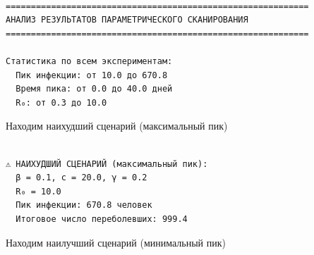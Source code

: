 \documentclass[
  12pt,
  a4paper,
  DIV=11,
  numbers=noendperiod]{scrreprt}
\newenvironment{Shaded}{\begin{snugshade}}{\end{snugshade}}
\newcommand{\FloatTok}[1]{\textcolor[rgb]{0.68,0.00,0.00}{#1}}
\newcommand{\FunctionTok}[1]{\textcolor[rgb]{0.28,0.35,0.67}{#1}}
\newcommand{\NormalTok}[1]{\textcolor[rgb]{0.00,0.23,0.31}{#1}}
\newcommand{\OperatorTok}[1]{\textcolor[rgb]{0.37,0.37,0.37}{#1}}
\newcommand{\SpecialCharTok}[1]{\textcolor[rgb]{0.37,0.37,0.37}{#1}}
\newcommand{\StringTok}[1]{\textcolor[rgb]{0.13,0.47,0.30}{#1}}
\begin{document}
\begin{verbatim}

============================================================
АНАЛИЗ РЕЗУЛЬТАТОВ ПАРАМЕТРИЧЕСКОГО СКАНИРОВАНИЯ
============================================================

Статистика по всем экспериментам:
  Пик инфекции: от 10.0 до 670.8
  Время пика: от 0.0 до 40.0 дней
  R₀: от 0.3 до 10.0
\end{verbatim}

Находим наихудший сценарий (максимальный пик)

\begin{Shaded}
\end{Shaded}

\begin{verbatim}

⚠️ НАИХУДШИЙ СЦЕНАРИЙ (максимальный пик):
  β = 0.1, c = 20.0, γ = 0.2
  R₀ = 10.0
  Пик инфекции: 670.8 человек
  Итоговое число переболевших: 999.4
\end{verbatim}

Находим наилучший сценарий (минимальный пик)
\end{document}
